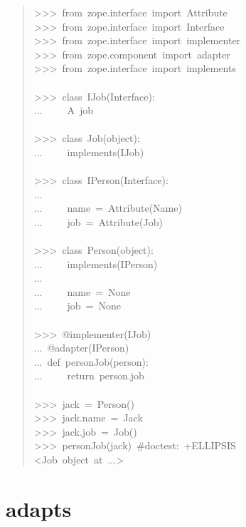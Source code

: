 \documentclass[a4paper,openany,twoside,final]{book}
\begin{document}
\begin{quote}{\ttfamily \raggedright \noindent
>{}>{}>~from~zope.interface~import~Attribute\\
>{}>{}>~from~zope.interface~import~Interface\\
>{}>{}>~from~zope.interface~import~implementer\\
>{}>{}>~from~zope.component~import~adapter\\
>{}>{}>~from~zope.interface~import~implements\\
~\\
>{}>{}>~class~IJob(Interface):\\
...~~~~~\textquotedbl{}\textquotedbl{}\textquotedbl{}A~job\textquotedbl{}\textquotedbl{}\textquotedbl{}\\
~\\
>{}>{}>~class~Job(object):\\
...~~~~~implements(IJob)\\
~\\
>{}>{}>~class~IPerson(Interface):\\
...\\
...~~~~~name~=~Attribute(\textquotedbl{}Name\textquotedbl{})\\
...~~~~~job~=~Attribute(\textquotedbl{}Job\textquotedbl{})\\
~\\
>{}>{}>~class~Person(object):\\
...~~~~~implements(IPerson)\\
...\\
...~~~~~name~=~None\\
...~~~~~job~=~None\\
~\\
>{}>{}>~@implementer(IJob)\\
...~@adapter(IPerson)\\
...~def~personJob(person):\\
...~~~~~return~person.job\\
~\\
>{}>{}>~jack~=~Person()\\
>{}>{}>~jack.name~=~\textquotedbl{}Jack\textquotedbl{}\\
>{}>{}>~jack.job~=~Job()\\
>{}>{}>~personJob(jack)~\#doctest:~+ELLIPSIS\\
<Job~object~at~...>
}
\end{quote}


\section*{adapts%
  \label{adapts}%
}
\end{document}
